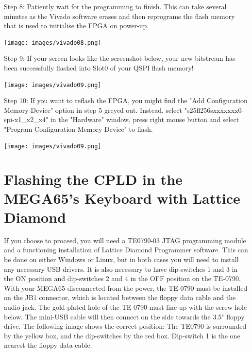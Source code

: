 \vspace{1mm}

\begin{minipage}{\linewidth}
  Step 8: Patiently wait for the programming to finish.
  This can take several minutes as the Vivado software erases
  and then reprograms the flash memory that is used to
  initialise the FPGA on power-up.
  \\
  \begin{center}
    \texttt{[image: images/vivado08.png]}
  \end{center}
\end{minipage}


\begin{minipage}{\linewidth}
Step 9: If your screen looks like the screenshot below,
your new bitstream has been successfully flashed into Slot0 of your QSPI flash memory!
  \\
  \begin{center}
    \texttt{[image: images/vivado09.png]}
  \end{center}
\end{minipage}

\vspace{5mm}

\begin{minipage}{\linewidth}
Step 10: If you want to reflash the FPGA, you might find the
"Add Configuration Memory Device" option in step 5 greyed out.
Instead, select "s25fl256sxxxxxxx0-spi-x1\_x2\_x4"  in the "Hardware"
window, press right mouse button and select "Program Configuration
Memory Device" to flash.
  \\
  \begin{center}
    \texttt{[image: images/vivado09.png]}
  \end{center}
\end{minipage}


\section{Flashing the CPLD in the MEGA65's Keyboard with Lattice Diamond}


If you choose to proceed, you will need a TE0790-03 JTAG programming
module and a functioning installation of Lattice Diamond Programmer software.
This can be done on either Windows or Linux, but in both cases you will
need to install any necessary USB drivers. It is also necessary to have
dip-switches 1 and 3 in the ON position and dip-switches 2 and 4 in the
OFF position on the TE-0790. With your MEGA65 disconnected from the power,
the TE-0790 must be installed on the JB1 connector, which is located
between the floppy data cable and the audio jack.
The gold-plated hole of the TE-0790 must line up with the screw hole below.
The mini-USB cable will then connect on the side towards the 3.5" floppy drive.
The following image shows the correct position: The TE0790 is surrounded
by the yellow box, and the dip-switches by the red box. Dip-switch 1 is
the one nearest the floppy data cable.


